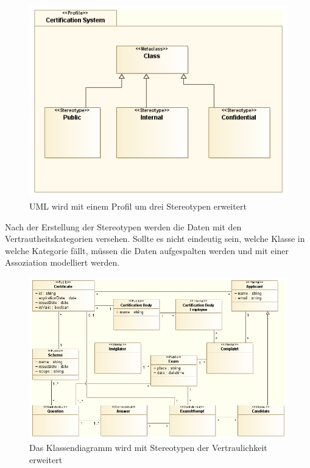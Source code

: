 \begin{figure}[!htbp]
    \centering
    \includegraphics[scale=0.5]{uml/datastereotypes.png}
    \caption{UML wird mit einem Profil um drei Stereotypen erweitert}
\end{figure}

Nach der Erstellung der Stereotypen werden die Daten mit den Vertrautheitskategorien versehen. Sollte es nicht eindeutig sein, welche Klasse in welche Kategorie fällt, müssen die Daten aufgespalten werden und mit einer Assoziation modelliert werden.

\begin{figure}[!htbp]
    \centering
    \includegraphics[scale=0.5]{uml/classstereotyped.png}
    \caption{Das Klassendiagramm wird mit Stereotypen der Vertraulichkeit erweitert}
\end{figure}

